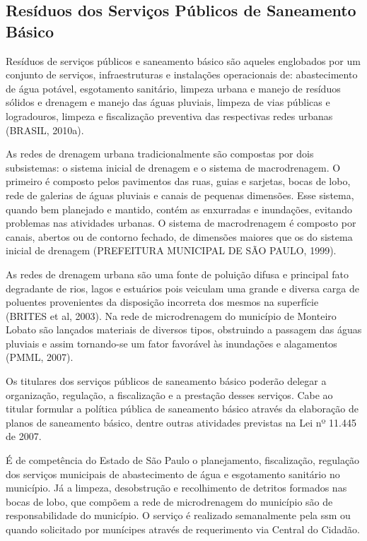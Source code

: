 %	
	
	\subsection{Resíduos dos Serviços Públicos de Saneamento Básico}
	
	Resíduos de serviços públicos e saneamento básico são aqueles englobados por um conjunto de serviços, infraestruturas e instalações operacionais de: abastecimento de água potável, esgotamento sanitário, limpeza urbana e manejo de resíduos sólidos e drenagem e manejo das águas pluviais, limpeza de vias públicas e logradouros, limpeza e fiscalização preventiva das respectivas redes urbanas (BRASIL, 2010a).  
	
	As redes de drenagem urbana tradicionalmente são compostas por dois subsistemas: o sistema inicial de drenagem e o sistema de macrodrenagem. O primeiro é composto pelos pavimentos das ruas, guias e sarjetas, bocas de lobo, rede de galerias de águas pluviais e canais de pequenas dimensões. Esse sistema, quando bem planejado e mantido, contém as enxurradas e inundações, evitando problemas nas atividades urbanas. O sistema de macrodrenagem é composto por canais, abertos ou de contorno fechado, de dimensões maiores que os do sistema inicial de drenagem (PREFEITURA MUNICIPAL DE SÃO PAULO, 1999).
	
	As redes de drenagem urbana são uma fonte de poluição difusa e principal fato degradante de rios, lagos e estuários pois veiculam uma grande e diversa carga de poluentes provenientes da disposição incorreta dos mesmos na superfície (BRITES et al, 2003). Na rede de microdrenagem do município de Monteiro Lobato são lançados materiais de diversos tipos, obstruindo a passagem das águas pluviais e assim tornando-se um fator favorável às inundações e alagamentos (PMML, 2007).
	
	Os titulares dos serviços públicos de saneamento básico poderão delegar a organização, regulação, a fiscalização e a prestação desses serviços. Cabe ao titular formular a política pública de saneamento básico através da elaboração de planos de saneamento básico, dentre outras atividades previstas na Lei nº 11.445 de 2007.
	
	É de competência do Estado de São Paulo o planejamento, fiscalização, regulação dos serviços municipais de abastecimento de água e esgotamento sanitário no município. Já a limpeza, desobstrução e recolhimento de detritos formados nas bocas de lobo, que compõem a rede de microdrenagem do município são de responsabilidade do município. O serviço é realizado semanalmente pela \gls{ssm} ou quando solicitado por munícipes através de requerimento via Central do Cidadão.
	
